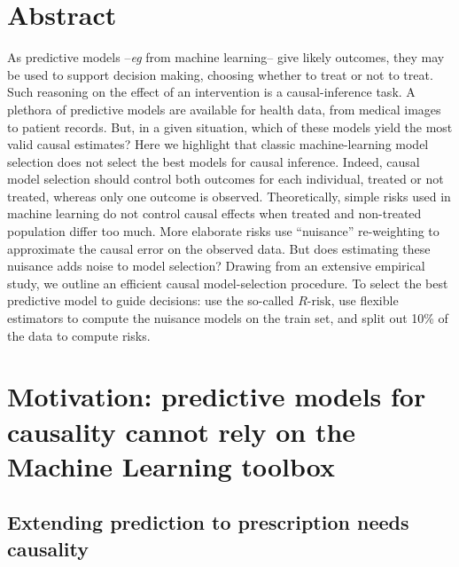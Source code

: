 \documentclass{report}
\begin{document}
\section{Abstract}\label{sec:causal_model_selection:abstract}


As predictive models --\emph{eg} from machine learning-- give likely outcomes,
they may be used to support decision making, choosing whether to treat or not to
treat. Such reasoning on the effect of an intervention is a causal-inference
task. A plethora of predictive models are available for health data, from
medical images to patient records. But, in a given situation, which of these
models yield the most valid causal estimates? Here we highlight that classic
machine-learning model selection does not select the best models for causal
inference. Indeed, causal model selection should control both outcomes for each
individual, treated or not treated, whereas only one outcome is observed.
Theoretically, simple risks used in machine learning do not control causal
effects when treated and non-treated population differ too much. More elaborate
risks use ``nuisance'' re-weighting to approximate the causal error on the
observed data. But does estimating these nuisance adds noise to model selection?
Drawing from an extensive empirical study, we outline an efficient causal
model-selection procedure. To select the best predictive model to guide
decisions: use the so-called $R\text{-risk}$, use flexible estimators to compute
the nuisance models on the train set, and split out 10\% of the data to compute
risks.

\section{Motivation: predictive models for causality cannot rely on the Machine Learning
  toolbox}\label{sec:causal_model_selection:motivation}

\subsection{Extending prediction to prescription needs causality}\label{subsec:causal_model_selection:extending_prediction}

\end{document}
